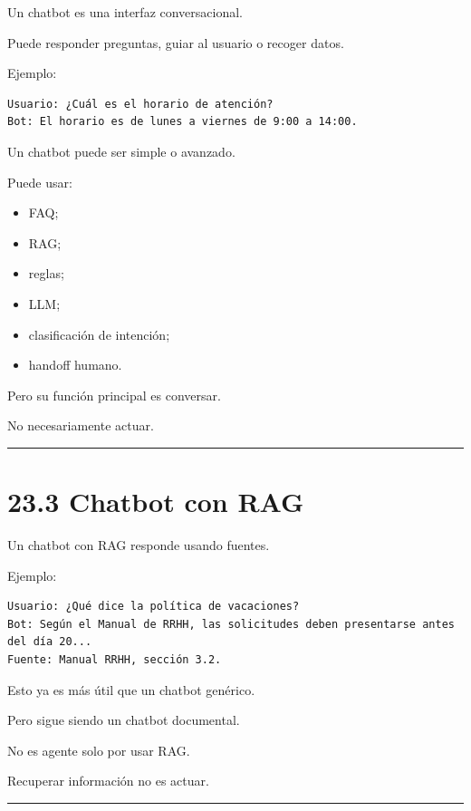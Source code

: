 Un chatbot es una interfaz conversacional.

Puede responder preguntas, guiar al usuario o recoger datos.

Ejemplo:

\begin{lstlisting}
Usuario: ¿Cuál es el horario de atención?
Bot: El horario es de lunes a viernes de 9:00 a 14:00.
\end{lstlisting}

Un chatbot puede ser simple o avanzado.

Puede usar:

\begin{itemize}
\tightlist
\item
  FAQ;
\item
  RAG;
\item
  reglas;
\item
  LLM;
\item
  clasificación de intención;
\item
  handoff humano.
\end{itemize}

Pero su función principal es conversar.

No necesariamente actuar.

\begin{center}\rule{0.5\linewidth}{0.5pt}\end{center}

\section{23.3 Chatbot con RAG}\label{chatbot-con-rag}

Un chatbot con RAG responde usando fuentes.

Ejemplo:

\begin{lstlisting}
Usuario: ¿Qué dice la política de vacaciones?
Bot: Según el Manual de RRHH, las solicitudes deben presentarse antes del día 20...
Fuente: Manual RRHH, sección 3.2.
\end{lstlisting}

Esto ya es más útil que un chatbot genérico.

Pero sigue siendo un chatbot documental.

No es agente solo por usar RAG.

Recuperar información no es actuar.

\begin{center}\rule{0.5\linewidth}{0.5pt}\end{center}

